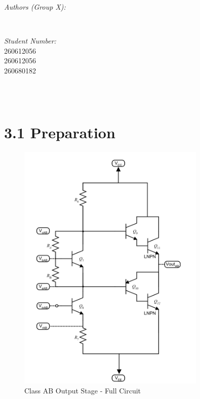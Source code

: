 \documentclass[12pt]{article}
\makeatletter
\let\theauthor\@author
\let\thedate\@date
\makeatother
\begin{document}
\begin{titlepage}
\begin{minipage}{0.4\textwidth}
\begin{flushleft}
            \emph{Authors (Group X):}\\
            \theauthor
            \end{flushleft}
            \end{minipage}~
            \begin{minipage}{0.4\textwidth}
            \begin{flushright} \large
            \emph{Student Number:} \\
            260612056 \\ 260612056 \\ 260680182                                  %
        \end{flushright}
    \end{minipage}\\[2 cm]
 
    {\large \thedate}\\[2 cm]
 
    \vfill
    
\end{titlepage}


\section*{3.1 Preparation}

\begin{figure}[H]
\centering
\includegraphics[width=0.8\textwidth]{main.PNG}
\caption{Class AB Output Stage - Full Circuit}
\end{figure}
\end{document}
